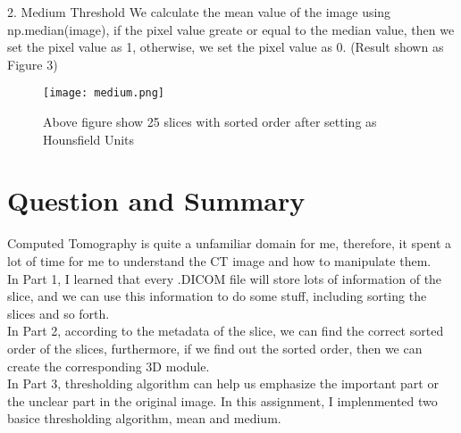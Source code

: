 \documentclass[a4paper,11pt]{article}
\begin{document}
2. Medium Threshold
We calculate the mean value of the image using np.median(image), if the pixel value greate or equal to the median value, then we set the pixel value as 1, otherwise, we set the pixel value as 0. (Result shown as Figure 3) 

\begin{figure}[h]
\centering
\texttt{[image: medium.png]}
\caption{Above figure show 25 slices with sorted order after setting as Hounsfield Units}
\label{fig1}
\end{figure}

\pagebreak

\section{Question and Summary}

Computed Tomography is quite a unfamiliar domain for me, therefore, it spent a lot of time for me to understand the CT image and how to manipulate them. \\

In Part 1, I learned that every .DICOM file will store lots of information of the slice, and we can use this information to do some stuff, including sorting the slices and so forth. \\ 

In Part 2, according to the metadata of the slice, we can find the correct sorted order of the slices, furthermore, if we find out the sorted order, then we can create the corresponding 3D module. \\

In Part 3, thresholding algorithm can help us emphasize the important part or the unclear part in the original image. In this assignment, I implenmented two basice thresholding algorithm, mean and medium. 
\end{document}
